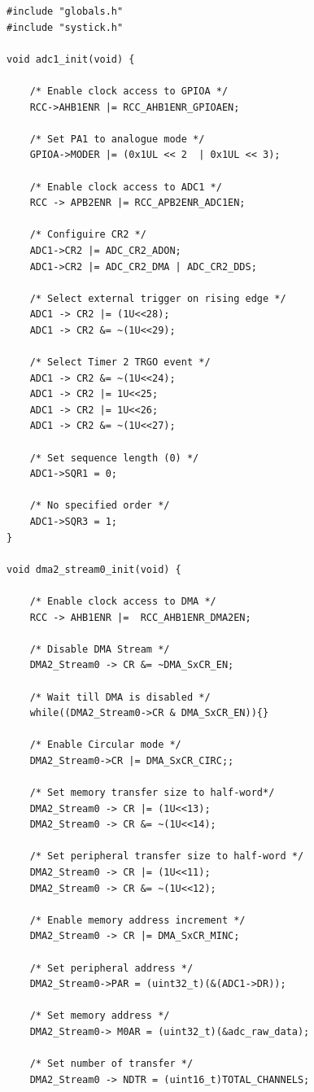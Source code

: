 \documentclass[12pt]{article}
\numberwithin{subsubsubsection}{subsubsection}
\begin{document}
\begin{verbatim}
#include "globals.h"
#include "systick.h"

void adc1_init(void) {
    
    /* Enable clock access to GPIOA */
    RCC->AHB1ENR |= RCC_AHB1ENR_GPIOAEN;
    
    /* Set PA1 to analogue mode */
    GPIOA->MODER |= (0x1UL << 2  | 0x1UL << 3);
    
    /* Enable clock access to ADC1 */
    RCC -> APB2ENR |= RCC_APB2ENR_ADC1EN;
    
    /* Configuire CR2 */
    ADC1->CR2 |= ADC_CR2_ADON;
    ADC1->CR2 |= ADC_CR2_DMA | ADC_CR2_DDS;
    
    /* Select external trigger on rising edge */
    ADC1 -> CR2 |= (1U<<28);
    ADC1 -> CR2 &= ~(1U<<29);
    
    /* Select Timer 2 TRGO event */
    ADC1 -> CR2 &= ~(1U<<24);
    ADC1 -> CR2 |= 1U<<25;
    ADC1 -> CR2 |= 1U<<26;
    ADC1 -> CR2 &= ~(1U<<27);
    
    /* Set sequence length (0) */
    ADC1->SQR1 = 0;
    
    /* No specified order */
    ADC1->SQR3 = 1;
}

void dma2_stream0_init(void) {

    /* Enable clock access to DMA */
    RCC -> AHB1ENR |=  RCC_AHB1ENR_DMA2EN;
    
    /* Disable DMA Stream */
    DMA2_Stream0 -> CR &= ~DMA_SxCR_EN;
    
    /* Wait till DMA is disabled */
    while((DMA2_Stream0->CR & DMA_SxCR_EN)){}
    
    /* Enable Circular mode */
    DMA2_Stream0->CR |= DMA_SxCR_CIRC;;
    
    /* Set memory transfer size to half-word*/
    DMA2_Stream0 -> CR |= (1U<<13);
    DMA2_Stream0 -> CR &= ~(1U<<14);
    
    /* Set peripheral transfer size to half-word */
    DMA2_Stream0 -> CR |= (1U<<11);
    DMA2_Stream0 -> CR &= ~(1U<<12);
    
    /* Enable memory address increment */
    DMA2_Stream0 -> CR |= DMA_SxCR_MINC;
    
    /* Set peripheral address */
    DMA2_Stream0->PAR = (uint32_t)(&(ADC1->DR));
    
    /* Set memory address */
    DMA2_Stream0-> M0AR = (uint32_t)(&adc_raw_data);
    
    /* Set number of transfer */
    DMA2_Stream0 -> NDTR = (uint16_t)TOTAL_CHANNELS;
    

\end{verbatim}
\end{document}
